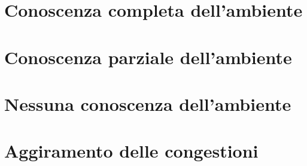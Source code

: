 \documentclass[12pt,a4paper,openright,oneside]{book}
\begin{document}
\section{Conoscenza completa dell'ambiente}


\section{Conoscenza parziale dell'ambiente}


\section{Nessuna conoscenza dell'ambiente}


\section{Aggiramento delle congestioni}

\end{document}
